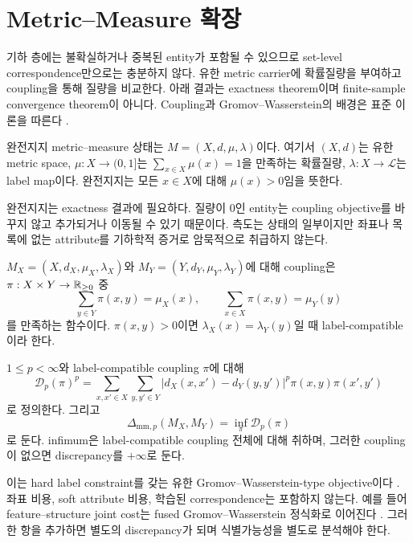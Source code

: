 \section{Metric--Measure 확장}

기하 층에는 불확실하거나 중복된 entity가 포함될 수 있으므로 set-level
correspondence만으로는 충분하지 않다. 유한 metric carrier에 확률질량을
부여하고 coupling을 통해 질량을 비교한다. 아래 결과는 exactness theorem이며
finite-sample convergence theorem이 아니다. Coupling과 Gromov--Wasserstein의
배경은 표준 이론을 따른다
\cite{memoli2011gromov,villani2009optimal,peyre2019computational}.

\begin{definition}
완전지지 metric--measure 상태는 $M=(X,d,\mu,\lambda)$이다. 여기서
$(X,d)$는 유한 metric space, $\mu:X\to(0,1]$는
$\sum_{x\in X}\mu(x)=1$을 만족하는 확률질량, $\lambda:X\to\mathcal L$는
label map이다. 완전지지는 모든 $x\in X$에 대해 $\mu(x)>0$임을 뜻한다.
\end{definition}

완전지지는 exactness 결과에 필요하다. 질량이 0인 entity는 coupling objective를
바꾸지 않고 추가되거나 이동될 수 있기 때문이다. 측도는 상태의 일부이지만
좌표나 목록에 없는 attribute를 기하학적 증거로 암묵적으로 취급하지 않는다.

\begin{definition}
$M_X=(X,d_X,\mu_X,\lambda_X)$와
$M_Y=(Y,d_Y,\mu_Y,\lambda_Y)$에 대해 coupling은
$\pi:X\times Y\to\mathbb{R}_{\geq0}$ 중
\[
 \sum_{y\in Y}\pi(x,y)=\mu_X(x),
 \qquad
 \sum_{x\in X}\pi(x,y)=\mu_Y(y)
\]
를 만족하는 함수이다. $\pi(x,y)>0$이면
$\lambda_X(x)=\lambda_Y(y)$일 때 label-compatible이라 한다.
\end{definition}

\begin{definition}
$1\leq p<\infty$와 label-compatible coupling $\pi$에 대해
\[
 \mathcal D_p(\pi)^p=
 \sum_{x,x'\in X}\sum_{y,y'\in Y}
 |d_X(x,x')-d_Y(y,y')|^p
 \pi(x,y)\pi(x',y')
\]
로 정의한다. 그리고
\[
 \Delta_{\mathrm{mm},p}(M_X,M_Y)=\inf_{\pi}\mathcal D_p(\pi)
\]
로 둔다. infimum은 label-compatible coupling 전체에 대해 취하며, 그러한
coupling이 없으면 discrepancy를 $+\infty$로 둔다.
\end{definition}

이는 hard label constraint를 갖는 유한 Gromov--Wasserstein-type objective이다
\cite{memoli2011gromov}.
좌표 비용, soft attribute 비용, 학습된 correspondence는 포함하지 않는다.
예를 들어 feature--structure joint cost는 fused Gromov--Wasserstein 정식화로
이어진다 \cite{vayer2020fused}. 그러한 항을 추가하면 별도의 discrepancy가 되며
식별가능성을 별도로 분석해야 한다.

